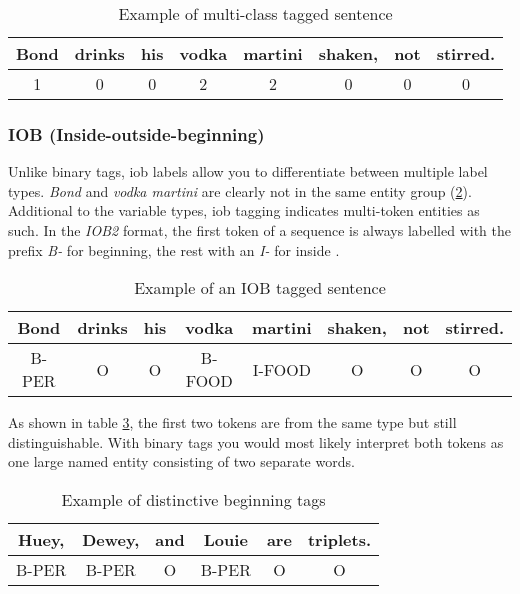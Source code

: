 \begin{table}[h!]
    \centering
    \begin{tabular}{|c|c|c|c|c|c|c|c|}
        \hline
        Bond & drinks & his & vodka & martini & shaken, & not & stirred. \\
        \hline
        1 & 0 & 0 & 2 & 2 & 0 & 0 & 0 \\
        \hline
    \end{tabular}
    \caption{Example of multi-class tagged sentence}
    \label{tbl:multiclass-labelling}
\end{table}

\subsubsection{IOB (Inside-outside-beginning)}

Unlike binary tags, \acrshort{iob} labels allow you to differentiate between multiple label types. \emph{Bond} and \emph{vodka martini} are clearly not in the same entity group (\ref{tbl:iob-labelling}). Additional to the variable types, \acrshort{iob} tagging indicates multi-token entities as such. In the \emph{IOB2} format, the first token of a sequence is always labelled with the prefix \emph{B-} for beginning, the rest with an \emph{I-} for inside \cite{bio95}.

\begin{table}[h!]
    \centering
    \begin{tabular}{|c|c|c|c|c|c|c|c|}
        \hline
        Bond & drinks & his & vodka & martini & shaken, & not & stirred. \\
        \hline
        B-PER & O & O & B-FOOD & I-FOOD & O & O & O \\
        \hline
    \end{tabular}
    \caption{Example of an IOB tagged sentence}
    \label{tbl:iob-labelling}
\end{table}

As shown in table \ref{tbl:iob-labelling2}, the first two tokens are from the same type but still distinguishable. With binary tags you would most likely interpret both tokens as one large named entity consisting of two separate words.

\begin{table}[ht!]
    \centering
    \begin{tabular}{|c|c|c|c|c|c|}
        \hline
        Huey, & Dewey, & and & Louie & are & triplets. \\
        \hline
        B-PER & B-PER & O & B-PER & O & O \\
        \hline
    \end{tabular}
    \caption{Example of distinctive beginning tags}
    \label{tbl:iob-labelling2}
\end{table}


